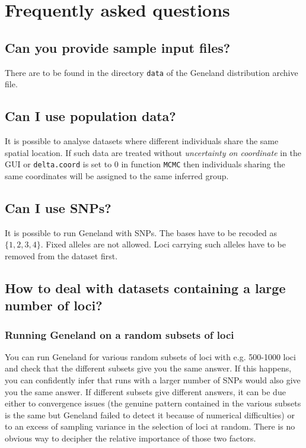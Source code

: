 \documentclass[a4paper,10pt]{article}
\begin{document}
\appendix
\clearpage
\section{Frequently asked questions}

\subsection{Can you provide sample input files?}
There are to be found in the directory {\tt data} of the Geneland distribution archive file.

\subsection{Can I use population data?}
It is possible to analyse datasets where different individuals share the same spatial location. 
If such data are treated without {\em uncertainty on coordinate } in the GUI or {\tt delta.coord} is set to 0 in function {\tt MCMC} 
then individuals sharing the same coordinates will be assigned to the same inferred group. 

\subsection{Can I use SNPs?}\label{sec:faq_SNPSs} 
It is possible to run {\sc Geneland} with SNPs. The bases have to be recoded as $\{1,2,3,4\}$.
Fixed alleles are not allowed. Loci carrying such alleles have to be removed from 
the dataset first. 

\subsection[Large number of loci]{How to deal with datasets containing a large number of loci?}
\subsubsection{Running {\sc Geneland} on a random subsets of loci}
You can run {\sc Geneland} for various random subsets of loci with e.g. 500-1000 loci and check that 
the different subsets give you the same answer. 
If this happens, you can confidently infer that runs with a larger number of SNPs would also give you the same answer. 
If different subsets give different answers, it can be due either to convergence issues (the genuine pattern contained in 
the various subsets is the same but {\sc Geneland} failed to detect it because of numerical difficulties) or 
to an excess of sampling variance in the selection of loci at random. There is no obvious way 
to decipher the relative importance of those two factors. 
\end{document}
